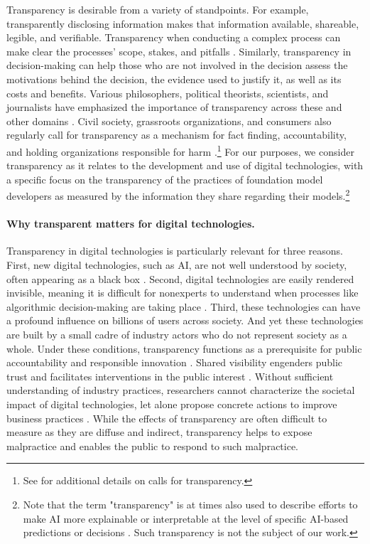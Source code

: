 \documentclass[screen, authorversion, acmsmall]{acmart}
\begin{document}
Transparency is desirable from a variety of standpoints.
For example, transparently disclosing information makes that information available, shareable, legible, and verifiable. 
Transparency when conducting a complex process can make clear the processes' scope, stakes, and pitfalls \citep{lathrop2010open}. 
Similarly, transparency in decision-making can help those who are not involved in the decision assess the motivations behind the decision, the evidence used to justify it, as well as its costs and benefits.
Various philosophers, political theorists, scientists, and journalists have emphasized the importance of transparency across these and other domains \citep{johnston2006good,florini2007right, benkler2013practical, schudson2015rise}. 
Civil society, grassroots organizations, and consumers also regularly call for transparency as a mechanism for fact finding, accountability, and holding organizations responsible for harm \citep{heikkila2023high,diresta2022openblackbox}.\footnote{See  for additional details on calls for transparency.}
For our purposes, we consider transparency as it relates to the development and use of digital technologies, with a specific focus on the transparency of the practices of foundation model developers as measured by the information they share regarding their models.\footnote{Note that the term "transparency" is at times also used to describe efforts to make AI more explainable or interpretable at the level of specific AI-based predictions or decisions \citep{liao2023transparency, zou2023representation}. 
Such transparency is not the subject of our work.} 

\paragraph{Why transparent matters for digital technologies.}
Transparency in digital technologies is particularly relevant for three reasons.
First, new digital technologies, such as AI, are not well understood by society, often appearing as a black box \citep{castelvecchi2016openblackbox}. 
Second, digital technologies are easily rendered invisible, meaning it is difficult for nonexperts to understand when processes like algorithmic decision-making are taking place \citep{ng_conceptualizing_2021}.
Third, these technologies can have a profound influence on billions of users across society.
And yet these technologies are built by a small cadre of industry actors who do not represent society as a whole.
Under these conditions, transparency functions as a prerequisite for public accountability and responsible innovation \citep{klyman2023open}.
Shared visibility engenders public trust and facilitates interventions in the public interest \citep{hardin2002trust}. 
Without sufficient understanding of industry practices, researchers cannot characterize the societal impact of digital technologies, let alone propose concrete actions to improve business practices \citep{pasquale2015black}.
While the effects of transparency are often difficult to measure as they are diffuse and indirect, transparency helps to expose malpractice and enables the public to respond to such malpractice.
\end{document}
